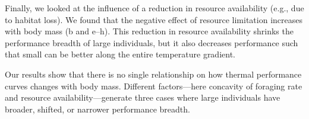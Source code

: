 Finally, we looked at the influence of a reduction in resource availability (e.g., due to habitat loss).
We found that the negative effect of resource limitation increases with body mass (b and e--h).
This reduction in resource availability shrinks the performance breadth of large individuals, but it also decreases performance such that small can be better along the entire temperature gradient.

Our results show that there is no single relationship on how thermal performance curves changes with body mass.
Different factors---here concavity of foraging rate and resource availability---generate three cases where large individuals have broader, shifted, or narrower performance breadth.
